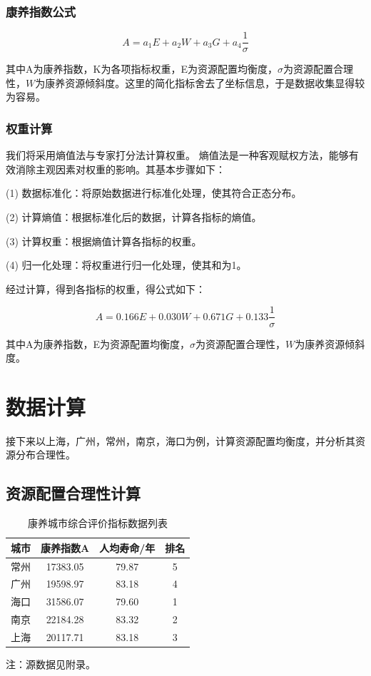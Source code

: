 \documentclass[12pt,a4paper]{article}
\begin{document}
\subsubsection{康养指数公式}

\[
A = a_1E + a_2W + a_3G + a_4\frac{1}{\sigma}
\]

其中A为康养指数，K为各项指标权重，E为资源配置均衡度，$\sigma$为资源配置合理性，$W$为康养资源倾斜度。这里的简化指标舍去了坐标信息，于是数据收集显得较为容易。

\subsubsection{权重计算}

我们将采用熵值法\cite{03}与专家打分法计算权重。
熵值法是一种客观赋权方法，能够有效消除主观因素对权重的影响。其基本步骤如下：

(1) 数据标准化：将原始数据进行标准化处理，使其符合正态分布。

(2) 计算熵值：根据标准化后的数据，计算各指标的熵值。

(3) 计算权重：根据熵值计算各指标的权重。

(4) 归一化处理：将权重进行归一化处理，使其和为1。

经过计算，得到各指标的权重，得公式如下：

\[
A = 0.166E + 0.030W + 0.671G + 0.133\frac{1}{\sigma}
\]

其中A为康养指数，E为资源配置均衡度，$\sigma$为资源配置合理性，$W$为康养资源倾斜度。


\section{数据计算}

接下来以上海，广州，常州，南京，海口为例，计算资源配置均衡度，并分析其资源分布合理性。
\subsection{资源配置合理性计算}

\begin{table}[h]
  \centering
  \caption{康养城市综合评价指标数据列表}
  \begin{tabular}{c|c|c|c}
    \toprule[2pt]
    城市 &康养指数A&人均寿命/年&排名\\
    \midrule[1pt]
    常州 & 17383.05 & 79.87 & 5 \\
    广州 & 19598.97 & 83.18 & 4 \\
    海口 & 31586.07 & 79.60 & 1 \\
    南京 & 22184.28 & 83.32 & 2 \\
    上海 & 20117.71 & 83.18 & 3 \\
    \bottomrule[2pt]
  \end{tabular}

  \vspace{0.5em}
  {\footnotesize 注：源数据见附录。}
\end{table}
\end{document}

